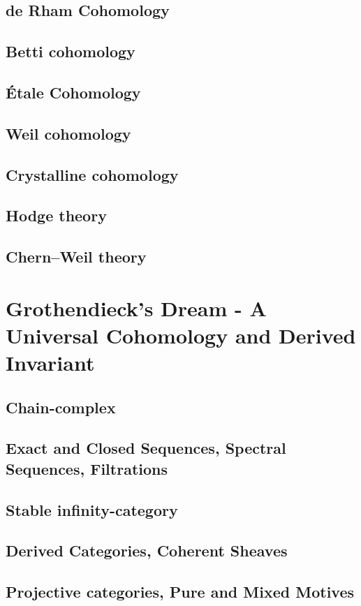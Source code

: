 \documentclass{article}
\theoremstyle{definition}
\begin{document}
    \subsection{de Rham Cohomology}
    \subsection{Betti cohomology}
    \subsection{Étale Cohomology}
    \subsection{Weil cohomology}
    \subsection{Crystalline cohomology}
    \subsection{Hodge theory}
    \subsection{Chern–Weil theory}

\section{Grothendieck's Dream - A Universal Cohomology and Derived Invariant}
    \subsection{Chain-complex}
    \subsection{Exact and Closed Sequences, Spectral Sequences, Filtrations}
    \subsection{Stable infinity-category}
    \subsection{Derived Categories, Coherent Sheaves}
    \subsection{Projective categories, Pure and Mixed Motives}
\end{document}
